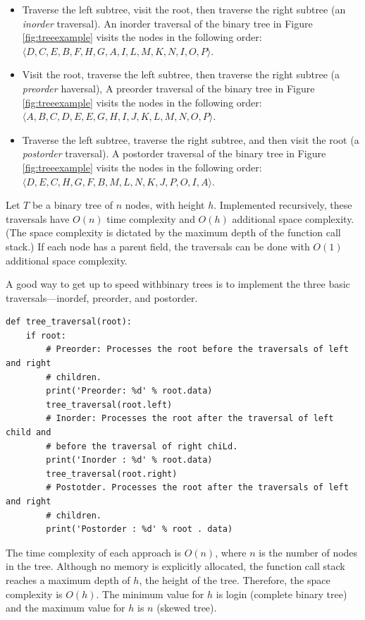 \documentclass[11pt,a4paper]{article}
\begin{document}
\begin{itemize}
  \item Traverse the left subtree, visit the root, then traverse the right
  subtree (an \textit{inorder} traversal). An inorder traversal of the binary
  tree in Figure \ref{fig:treeexample} visits the nodes in the following order:
  $\langle D, C, E, B, F, H, G, A, I, L, M, K, N, I, O, P\rangle$.
  \item Visit the root, traverse the left subtree, then traverse the right
  subtree (a \textit{preorder} haversal), A preorder traversal of the binary tree in
  Figure \ref{fig:treeexample} visits the nodes in the following order: $\langle A, B,
  C, D, E, E, G, H, I, J, K, L, M, N, O, P\rangle$.
  \item Traverse the left subtree, traverse the right subtree, and then visit
  the root (a \textit{postorder} traversal). A postorder traversal of the binary tree in
  Figure \ref{fig:treeexample} visits the nodes in the following order: $\langle D,
  E, C, H, G, F, B, M, L, N, K, J, P, O, I, A\rangle$.
\end{itemize}

Let $T$ be a binary tree of $n$ nodes, with height $h$. Implemented recursively, these
traversals have $O(n)$ time complexity and $O(h)$ additional space complexity. (The
space complexity is dictated by the maximum depth of the function call stack.)
If each node has a parent field, the traversals can be done with $O(1)$ additional
space complexity.

A good way to get up to speed withbinary trees is to implement the three basic
traversals---inordef, preorder, and postorder.

\begin{verbatim}
def tree_traversal(root):
    if root:
        # Preorder: Processes the root before the traversals of left and right 
        # children.
        print('Preorder: %d' % root.data)
        tree_traversal(root.left)
        # Inorder: Processes the root after the traversal of left child and 
        # before the traversal of right chiLd.
        print('Inorder : %d' % root.data)
        tree_traversal(root.right)
        # Postotder. Processes the root after the traversals of left and right 
        # children.
        print('Postorder : %d' % root . data)
\end{verbatim}
  
The time complexity of each approach is $O(n)$, where $n$ is the number of nodes in
the tree. Although no memory is explicitly allocated, the function call stack
reaches a maximum depth of $h$, the height of the tree. Therefore, the space
complexity is $O(h)$. The minimum value for $h$ is login (complete binary tree) and
the maximum value for $h$ is $n$ (skewed tree).
\end{document}
